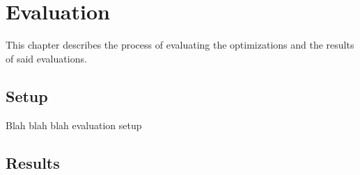 \chapter{Evaluation}
\label{chp:chapter_4}

This chapter describes the process of evaluating the optimizations and the results of said evaluations.

\section{Setup}
\label{sec:evaluation_setup}

Blah blah blah evaluation setup

\section{Results}
\label{sec:evaluation_results}


